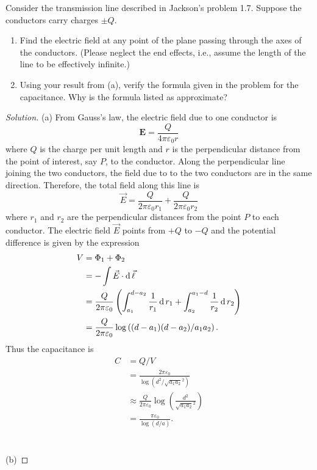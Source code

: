 \begin{problem}
Consider the transmission line described in Jackson's problem
1.7. Suppose the conductors carry charges $\pm Q$.
\begin{enumerate}[noitemsep,label=(\alph*)]
\item Find the electric field at any point of the plane passing
  through the axes of the conductors. (Please neglect the end
  effects, i.e., assume the length of the line to be effectively
  infinite.)
\item Using your result from (a), verify the formula given in the
  problem for the capacitance. Why is the formula listed as
  approximate?
\end{enumerate}
\end{problem}
\begin{proof}[Solution]
(a) From Gauss's law, the electric field due to one conductor is
\begin{equation}
\label{eq:electric-field-conductor}
\textbf{E}=\frac{Q}{4\pi\varepsilon_0 r}
\end{equation}
where $Q$ is the charge per unit length and $r$ is the
perpendicular distance from the point of interest, say $P$, to
the conductor. Along the perpendicular line joining the two
conductors, the field due to to the two conductors are in the
same direction. Therefore, the total field along this line is
\begin{equation}
\label{eq:total-electric-field}
\vec{E}=\frac{Q}{2\pi\varepsilon_0
  r_1}+\frac{Q}{2\pi\varepsilon_0 r_2}
\end{equation}
where $r_1$ and $r_2$ are the perpendicular distances from the
point $P$ to each conductor. The electric field $\vec{E}$
points from $+Q$ to $-Q$ and the potential difference is given by
the expression
\begin{align*}
V&=\Phi_1+\Phi_2\\
 &=-\int\vec{E}\cdot\operatorname{d}\vec{\ell}\\
 &=\frac{Q}{2\pi\varepsilon_0}
   \left(\int_{a_1}^{d-a_2}\frac{1}{r_1}\operatorname{d}
   r_1+\int_{a_2}^{a_1-d}\frac{1}{r_2}\operatorname{d} r_2\right)\\
 &=\frac{Q}{2\pi\varepsilon_0}\log\left((d-a_1)(d-a_2)/a_1a_2\right).
\end{align*}
Thus the capacitance is
\begin{align*}
C&=Q/V\\
 &=\frac{2\pi\varepsilon_0}{\log\left(d^2/\sqrt{a_1a_2}^2\right)}\\
 &\approx
 \frac{Q}{2\pi\varepsilon_0}{\log\left(\frac{d^2}{\sqrt{a_1a_2}^2}\right)}\\
 &=\frac{\pi\varepsilon_0}{\log(d/a)}.
\end{align*}
\\\\
(b)
\end{proof}
\newpage


